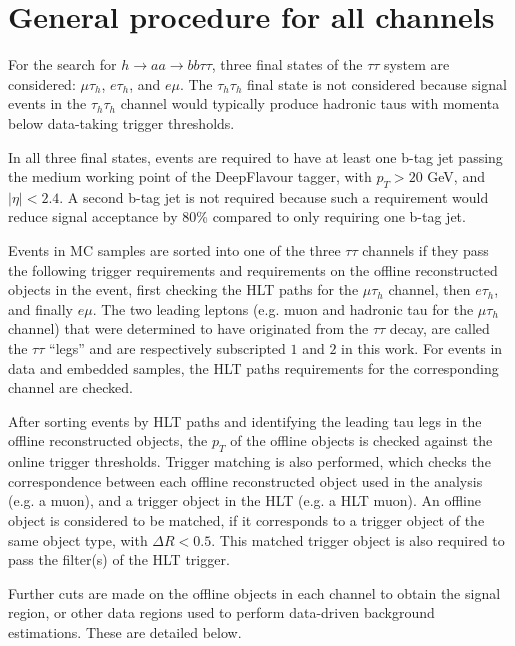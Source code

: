 \section{General procedure for all channels}
For the search for $h \rightarrow aa \rightarrow bb\tau\tau$, three final states of the $\tau\tau$ system are considered: $\mu\tau_{h}$, $e\tau_{h}$, and $e\mu$. The $\tau_{h}\tau_{h}$ final state is not considered because signal events in the $\tau_{h}\tau_{h}$ channel would typically produce hadronic taus with momenta below data-taking trigger thresholds.

In all three final states, events are required to have at least one b-tag jet passing the medium working point of the DeepFlavour tagger, with $p_{T} > 20$ GeV, and $|\eta| < 2.4$. A second b-tag jet is not required because such a requirement would reduce signal acceptance by 80\% compared to only requiring one b-tag jet.


Events in MC samples are sorted into one of the three $\tau\tau$ channels if they pass the following trigger requirements and requirements on the offline reconstructed objects in the event, first checking the HLT paths for the $\mu\tau_{h}$ channel, then $e\tau_{h}$, and finally $e\mu$. The two leading leptons (e.g. muon and hadronic tau for the $\mu\tau_{h}$ channel) that were determined to have originated from the $\tau\tau$ decay, are called the $\tau\tau$ ``legs'' and are respectively subscripted $1$ and $2$ in this work. For events in data and embedded samples, the HLT paths requirements for the corresponding channel are checked.

After sorting events by HLT paths and identifying the leading tau legs in the offline reconstructed objects, the $p_{T}$ of the offline objects is checked against the online trigger thresholds. Trigger matching is also performed, which checks the correspondence between each offline reconstructed object used in the analysis (e.g. a muon), and a trigger object in the HLT (e.g. a HLT muon). An offline object is considered to be matched, if it corresponds to a trigger object of the same object type, with $\Delta R < 0.5$. This matched trigger object is also required to pass the filter(s) of the HLT trigger.

Further cuts are made on the offline objects in each channel to obtain the signal region, or other data regions used to perform data-driven background estimations. These are detailed below. 

